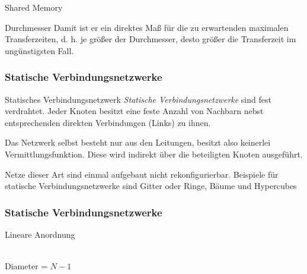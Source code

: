 \begin{defi}{Shared Memory}
\begin{defi}[Verbindungsnetzwerk]{Durchmesser}
        Damit ist er ein direktes Maß für die zu erwartenden maximalen Transferzeiten, d. h. je größer der Durchmesser, desto größer die Transferzeit im ungünstigsten Fall.
    \end{defi}

    \subsubsection{Statische Verbindungsnetzwerke}

    \begin{defi}{Statisches Verbindungsnetzwerk}
        \emph{Statische Verbindungsnetzwerke} sind fest verdrahtet.
        Jeder Knoten besitzt eine feste Anzahl von Nachbarn nebst entsprechenden direkten Verbindungen (Links) zu ihnen.

        Das Netzwerk selbst besteht nur aus den Leitungen, besitzt also keinerlei Vermittlungsfunktion.
        Diese wird indirekt über die beteiligten Knoten ausgeführt.

        Netze dieser Art sind einmal aufgebaut nicht rekonfigurierbar.
        Beispiele für statische Verbindungsnetzwerke sind Gitter oder Ringe, Bäume und Hypercubes
    \end{defi}

    \subsubsection{Statische Verbindungsnetzwerke}

    \begin{defi}{Lineare Anordnung}
        \begin{center}
            \\
            Diameter = $N-1$
        \end{center}
    \end{defi}


\end{defi}
